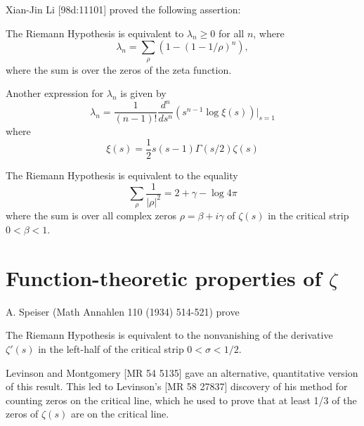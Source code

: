 \documentclass[12pt,letterpaper, reqno]{amsart}
\begin{document}
\begin{problemblock}
 Xian-Jin Li [98d:11101] proved the following assertion:
\begin{rhequivalence}[5.2]The Riemann Hypothesis is
equivalent to
$\lambda_n\ge 0$ for all $n$, where
$$
\lambda_n =\sum_\rho (1-(1-1/\rho)^n),
$$
where the sum is over the zeros of the zeta function.
\end{rhequivalence}

\begin{distinguishedremark}
Another expression for $\lambda_n$ is given by
$$
\lambda_n=\frac{1}{(n-1)!}\frac{d^n}{ds^n}(s^{n-1}\log \xi(s))\vert_{s=1}
$$
where
$$
\xi(s)=\frac12s(s-1)\Gamma(s/2)\zeta(s)
$$
\end{distinguishedremark}
\end{problemblock}

\begin{problemblock}
\begin{rhequivalence}[5.3]
The Riemann Hypothesis is equivalent to the equality
$$ \sum_{\rho} \frac{1}{|\rho|^2} = 2+\gamma-\log 4\pi
$$
where the sum is over all complex zeros $\rho=\beta+i\gamma$ of $\zeta(s)$ in the critical strip $0<\beta<1$.
\end{rhequivalence}
\end{problemblock}


\section{Function-theoretic properties of $\zeta$ }

\begin{problemblock}
A. Speiser (Math Annahlen 110 (1934) 514-521) prove
\begin{rhequivalence}[6.1]
The Riemann Hypothesis is
equivalent to
the nonvanishing of the derivative $\zeta'(s)$ in the
left-half of the critical strip $0<\sigma< 1/2$.
\end{rhequivalence}

\begin{remark} Levinson and Montgomery [MR 54 5135]
gave an alternative, quantitative version of this result.
This led to Levinson's
[MR 58 27837] discovery of his method for counting zeros on the critical
line,  which he used to prove that at least 1/3 of the zeros of
$\zeta(s)$ are on the critical line.
\end{remark}

\end{problemblock}
\end{document}
